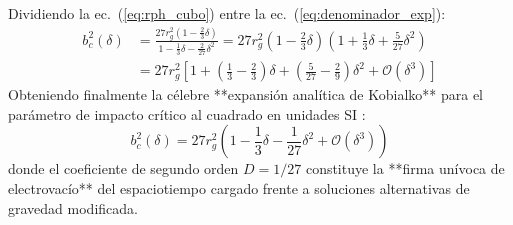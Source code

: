 Dividiendo la ec.~(\ref{eq:rph_cubo}) entre la ec.~(\ref{eq:denominador_exp}):
\begin{align}
    b_c^2(\delta) &= \frac{27 r_g^2 \left( 1 - \frac{2}{3}\delta \right)}{1 - \frac{1}{3}\delta - \frac{2}{27}\delta^2} = 27 r_g^2 \left( 1 - \frac{2}{3}\delta \right) \left( 1 + \frac{1}{3}\delta + \frac{5}{27}\delta^2 \right) \nonumber \\[0.2cm]
    &= 27 r_g^2 \left[ 1 + \left( \frac{1}{3} - \frac{2}{3} \right)\delta + \left( \frac{5}{27} - \frac{2}{9} \right)\delta^2 + \mathcal{O}(\delta^3) \right]
\end{align}
Obteniendo finalmente la célebre **expansión analítica de Kobialko** para el parámetro de impacto crítico al cuadrado en unidades SI \citep{perturbaciones_en_bh, Kobialko2024}:
\begin{equation}
    b_c^2(\delta) = 27 r_g^2 \left( 1 - \frac{1}{3}\delta - \frac{1}{27}\delta^2 + \mathcal{O}(\delta^3) \right)
    \label{eq:bc2_kobialko_SI}
\end{equation}
donde el coeficiente de segundo orden $D = 1/27$ constituye la **firma unívoca de electrovacío** del espaciotiempo cargado frente a soluciones alternativas de gravedad modificada.
